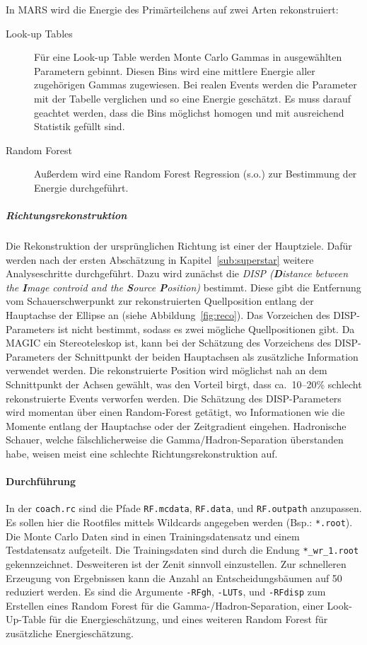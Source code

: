 In MARS wird die Energie des Primärteilchens auf zwei Arten rekonstruiert:
\begin{description}
	\item[\quad Look-up Tables] Für eine Look-up Table werden Monte Carlo
		Gammas in ausgewählten Parametern gebinnt.
		Diesen Bins wird eine mittlere Energie aller
		zugehörigen Gammas zugewiesen.
		Bei realen Events werden die Parameter mit der Tabelle verglichen
		und so eine Energie geschätzt.
		Es muss darauf geachtet werden,
		dass die Bins möglichst homogen und mit ausreichend Statistik gefüllt sind.
	\item[\quad Random Forest] Außerdem wird eine Random Forest Regression (s.o.)
		zur Bestimmung der Energie durchgeführt.
\end{description}

\subparagraph{Richtungsrekonstruktion}%
\label{par:position}

Die Rekonstruktion der ursprünglichen Richtung ist einer der Hauptziele.
Dafür werden nach der ersten Abschätzung in Kapitel~\ref{sub:superstar} weitere
Analyseschritte durchgeführt.
Dazu wird zunächst die \textit{DISP (\textbf{D}istance between the
\textbf{I}mage controid and the \textbf{S}ource \textbf{P}osition)} bestimmt.
Diese gibt die Entfernung vom Schauerschwerpunkt zur rekonstruierten Quellposition
entlang der Hauptachse der Ellipse an (siehe Abbildung~\ref{fig:reco}).
Das Vorzeichen des DISP-Parameters ist nicht bestimmt,
sodass es zwei mögliche Quellpositionen gibt.
Da MAGIC ein Stereoteleskop ist,
kann bei der Schätzung des Vorzeichens des DISP-Parameters
der Schnittpunkt der beiden Hauptachsen als zusätzliche Information
verwendet werden.
Die rekonstruierte Position wird möglichst nah an dem Schnittpunkt der Achsen
gewählt, was den Vorteil birgt,
dass ca.\ 10--20\% schlecht rekonstruierte Events verworfen werden.
Die Schätzung des DISP-Parameters wird momentan über einen Random-Forest
getätigt, wo Informationen wie die Momente entlang der
Hauptachse oder der Zeitgradient eingehen.
Hadronische Schauer, welche fälschlicherweise die Gamma/Hadron-Separation
überstanden habe, weisen meist eine schlechte Richtungsrekonstruktion auf.

\paragraph{Durchführung}%
In der \texttt{coach.rc} sind die Pfade
\texttt{RF.mcdata},
\texttt{RF.data},
und \texttt{RF.outpath}
anzupassen.
Es sollen hier die Rootfiles mittels Wildcards angegeben werden
(Bsp.: \texttt{*.root}).
Die Monte Carlo Daten sind in einen Trainingsdatensatz
und einem Testdatensatz aufgeteilt.
Die Trainingsdaten sind durch die Endung
\texttt{*\_wr\_1.root} gekennzeichnet.
Desweiteren ist der Zenit sinnvoll einzustellen.
Zur schnelleren Erzeugung von Ergebnissen kann die Anzahl an
Entscheidungsbäumen auf \num{50}
reduziert werden.
Es sind die Argumente
\texttt{-RFgh}, \texttt{-LUTs}, und \texttt{-RFdisp}
zum Erstellen eines Random Forest für die Gamma-/Hadron-Separation,
einer Look-Up-Table für die Energieschätzung,
und eines weiteren Random Forest für zusätzliche Energieschätzung.

